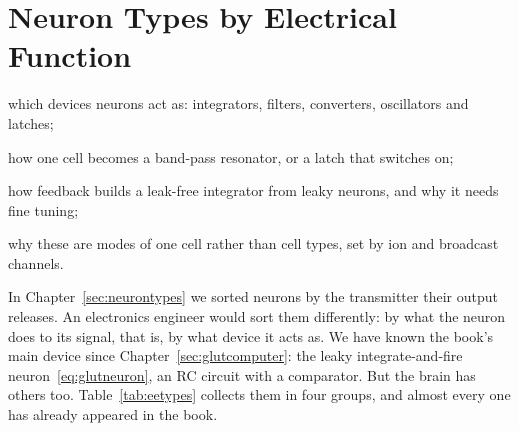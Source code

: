 \chapter{Neuron Types by Electrical Function}
\label{sec:eetypes}
\begin{chaptergoals}
\item which devices neurons act as: integrators, filters, converters, oscillators and latches;
\item how one cell becomes a band-pass resonator, or a latch that  switches on;
\item how feedback builds a leak-free integrator from leaky neurons, and why it needs fine tuning;
\item why these are modes of one cell rather than cell types, set by ion and broadcast channels.
\end{chaptergoals}

In Chapter~\ref{sec:neurontypes} we sorted neurons by the transmitter their output releases. An electronics engineer would sort them differently: by what the neuron does to its signal, that is, by what device it acts as. We have known the book's main device since Chapter~\ref{sec:glutcomputer}: the leaky integrate-and-fire neuron~\eqref{eq:glutneuron}, an RC circuit with a comparator. But the brain has others too. Table~\ref{tab:eetypes} collects them in four groups, and almost every one has already appeared in the book.

